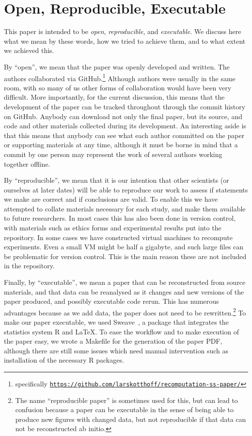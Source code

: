 \section{Open, Reproducible, Executable}

This paper is intended to be \emph{open}, 
\emph{reproducible}, and \emph{executable}.  We discuss here what we mean by these words, how we tried to achieve them, and to what extent we achieved this.

By ``open'', we mean that the paper was openly developed and written.  The authors collaborated via GitHub.\footnote{specifically
\texttt{\url{https://github.com/larskotthoff/recomputation-ss-paper/}}}   Although authors were usually in the same room, with so many of us other forms of collaboration would have been very 
difficult.  More importantly, for the current discussion, this means that the
development of the paper can be tracked throughout through the commit history on
GitHub.  Anybody can download not only the final paper, but its source, and code and other materials collected during its development.  An interesting aside is that this means that anybody can see what each author committed on the paper or supporting materials at any time, although it must be borne in mind that a commit by one person may represent the work of several authors working together offline.

By ``reproducible'', we mean that it is our intention that other scientists (or
ourselves at later dates) will be able to reproduce our work to assess if
statements we make are correct and if conclusions are valid.  To enable this we
have attempted to collate materials necessary for each study, and make them
available to future researchers.  In most cases this has also been done in
version control, 
with materials such as ethics forms and experimental results put into the repository.  In some cases we have constructed virtual machines to recompute experiments.  Even a small VM 
might be half a gigabyte, and such large files can be problematic for version
control. This is the main reason these are not included in the repository.

Finally, by ``executable'', we mean a paper that can be reconstructed from source 
materials, and that data can be reanalysed as it changes and new versions of the paper produced, and possibly executable code rerun.  
This has numerous advantages because as we add data, the paper does not need to be rewritten.\footnote{The name ``reproducible paper'' is sometimes used for this, but can lead to confusion because a paper can be executable in the sense of being able to produce new figures with 
changed data, but not reproducible if that data can not be reconstructed ab initio.}
To make our paper executable, we used Sweave~\cite{lmucs-papers:Leisch:2002}, a package that integrates the statistics system R and \LaTeX. 
To ease the workflow and to make execution of the paper easy, we wrote a Makefile for the generation of the paper PDF, although there are still some issues which need manual intervention such as installation of the necessary R packages. 

